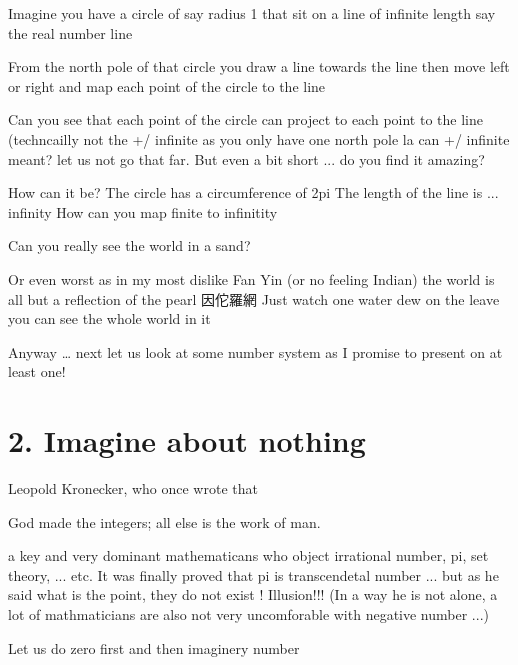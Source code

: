 \documentclass[letterpaper,10pt,english]{jupyterBook}
\begin{document}
\begin{sphinxVerbatim}[commandchars=\\\{\}]
Imagine you have a circle of say radius 1 that
    sit on a line of infinite length say the real number line
    
From the \PYGZdq{}north pole\PYGZdq{} of that circle you draw a line towards the line
    then move left or right and map each point of the circle to the line
    
Can you see that each point of the circle can project to each point to the line
    (techncailly not the +/\PYGZhy{} infinite as you only have one north pole la
     can +/\PYGZhy{} infinite meant? let us not go that far.  But even a bit short ...
     do you find it amazing?

How can it be?
The circle has a circumference of 2pi
The length of the line is ... infinity 
How can you map finite to infinitity

Can you really see the world in a sand?

Or even worst as in my most dislike Fan Yin (or no feeling Indian) 
    the world is all but a reflection of the pearl 因佗羅網
    Just watch one water dew on the leave you can see the whole world in it
\end{sphinxVerbatim}

\sphinxAtStartPar
Anyway … next let us look at some number system as I promise to present on at least one!

\sphinxstepscope


\chapter{2. Imagine about nothing}
\label{\detokenize{MacTwgssA2-zero:imagine-about-nothing}}\label{\detokenize{MacTwgssA2-zero::doc}}
\begin{sphinxVerbatim}[commandchars=\\\{\}]
 Leopold Kronecker, who once wrote that 
 
 \PYGZhy{}\PYGZhy{}\PYGZgt{} \PYGZdq{}God made the integers; all else is the work of man.\PYGZdq{}
 
     \PYGZhy{} a key and very dominant mathematicans who object irrational number, pi, set theory, ... etc. 
     \PYGZhy{} It was finally proved that pi is transcendetal number ...
     \PYGZhy{}  but as he said what is the point, they do not \PYGZdq{}exist\PYGZdq{} ! Illusion!!!
     \PYGZhy{} (In a way he is not alone, 
             a lot of mathmaticians are also not very uncomforable with negative number ...)

 \PYGZhy{}\PYGZhy{}\PYGZgt{} Let us do zero first and then imaginery number
\end{sphinxVerbatim}
\end{document}

